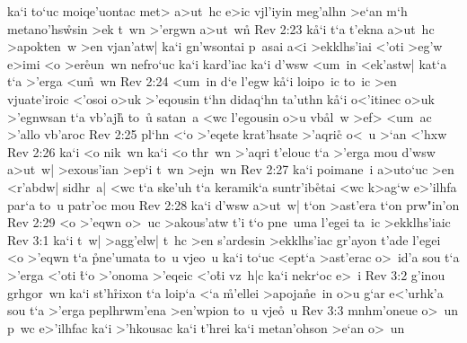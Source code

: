 ka`i
to`uc
moiqe'uontac
met>
a>ut~hc
e>ic
vjl'iyin
meg'alhn
>e`an
m`h
metano'hs\r{w}sin
>ek
t~wn
>'ergwn
a>ut~w\r{n}\bibvsend
{}
\vs Rev 2:23
k\r{a}`i
t`a
t'ekna
a>ut~hc
>apokten~w
>en
vjan'atw|
ka`i
gn'wsontai
p~asai
a<i
>ekklhs'iai
<'oti
>eg'w
e>imi
<o
>er\r{e}un~wn
nefro`uc
ka`i
kard'iac
ka`i
d'wsw
<um~in
<ek'astw|
kat`a
t`a
>'erga
<u\r{m}~wn\bibvsend
{}
\vs Rev 2:24
<um~in
d`e
l'egw
k\r{a}`i
loipo~ic
to~ic
>en
vjuate'iroic
<'osoi
o>uk
>'eqousin
t`hn
didaq`hn
ta'uthn
k\r{a}`i
o<'itinec
o>uk
>'egnwsan
t`a
vb'aj\r{h}
to~u\r{}
satan~a
<wc
l'egousin
o>u
vb\r{a}l~w
>ef>
<um~ac
>'allo
vb'aroc\bibvsend
\vs Rev 2:25
pl`hn
<`o
>'eqete
krat'hsate
>'aqri\r{c}
o<~u
>`an
<'hxw\bibvsend
\vs Rev 2:26
ka`i
<o
nik~wn
ka`i
<o
thr~wn
>'aqri
t'elouc
t`a
>'erga
mou
d'wsw
a>ut~w|
>exous'ian
>ep`i
t~wn
>ejn~wn\bibvsend
\vs Rev 2:27
ka`i
poimane~i
a>uto`uc
>en
<r'abdw|
sidhr~a|
<wc
t`a
ske'uh
t`a
keramik`a
suntr'ib\r{e}tai
<wc
k>ag`w
e>'ilhfa
par`a
to~u
patr'oc
mou\bibvsend
\vs Rev 2:28
ka`i
d'wsw
a>ut~w|
t`on
>ast'era
t`on
prw"in'on\bibvsend
\vs Rev 2:29
<o
>'eqwn
o>~uc
>akous'atw
t'i
t`o
pne~uma
l'egei
ta~ic
>ekklhs'iaic\bibvsend
\vs Rev 3:1
ka`i
t~w|
>agg'elw|
t~hc
>en
s'ardesin
>ekklhs'iac
gr'ayon
t'ade
l'egei
<o
>'eqwn
t`a
\r{p}ne'umata
to~u
vjeo~u
ka`i
to`uc
<ept`a
>ast'erac
o>~id'a
sou
t`a
>'erga
<'oti
\r{t}`o
>'onoma
>'eqeic
<'o\r{t}i
vz~h|c
ka`i
nekr`oc
e>~i\bibvsend
\vs Rev 3:2
g'inou
grhgor~wn
ka`i
st'h\r{r}ixon
t`a
loip`a
<`a
\r{m}'ellei
>apoja\r{n}e~in
o>u
g`ar
e<'urhk'a
sou
t`a
>'erga
peplhrwm'ena
>en'wpion
to~u
vje\r{o}~u\bibvsend
{}
\vs Rev 3:3
mnhm'oneue
o>~un
p~wc
e>'ilhfac
ka`i
>'hkousac
ka`i
t'hrei
ka`i
metan'ohson
>e`an
o>~un
